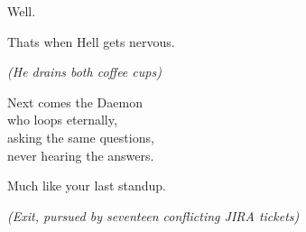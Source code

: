 Well.

That\textquotesingle s when Hell gets nervous.

\emph{(He drains both coffee cups)}

Next comes the Daemon\\
who loops eternally,\\
asking the same questions,\\
never hearing the answers.

Much like your last standup.

\emph{(Exit, pursued by seventeen conflicting JIRA tickets)}

\bookdivider
